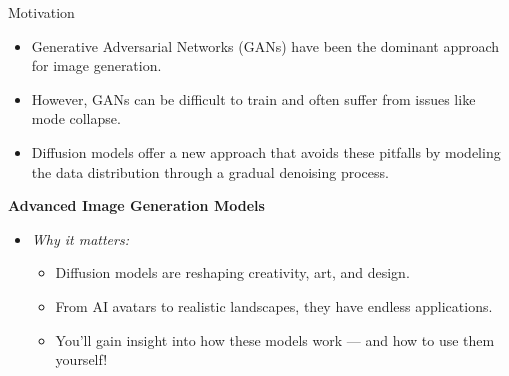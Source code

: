 \begin{frame}[allowframebreaks]{}
    \begin{figure}
        \centering
    \end{figure}
\end{frame}

\begin{frame}{Motivation}
    \begin{itemize}
        \item Generative Adversarial Networks (GANs) have been the dominant approach for image generation.
        \item However, GANs can be difficult to train and often suffer from issues like mode collapse.
        \item Diffusion models offer a new approach that avoids these pitfalls by modeling the data distribution through a gradual denoising process.
    \end{itemize}

    \vspace{1em}
    \textbf{Advanced Image Generation Models}

    \begin{itemize}
        \item \textit{Why it matters:}
        \begin{itemize}
            \item Diffusion models are reshaping creativity, art, and design.
            \item From AI avatars to realistic landscapes, they have endless applications.
            \item You'll gain insight into how these models work --- and how to use them yourself!
        \end{itemize}
    \end{itemize}
\end{frame}